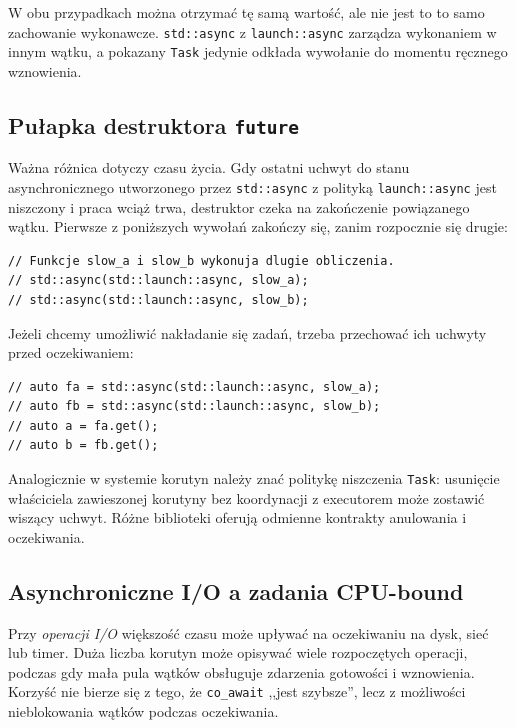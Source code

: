 W obu przypadkach można otrzymać tę samą wartość, ale nie jest to
to samo zachowanie wykonawcze. \texttt{std::async} z \texttt{launch::async}
zarządza wykonaniem w innym wątku, a pokazany \texttt{Task}
jedynie odkłada wywołanie do momentu ręcznego wznowienia.

\subsection{Pułapka destruktora \texttt{future}}

Ważna różnica dotyczy czasu życia. Gdy ostatni uchwyt do stanu
asynchronicznego utworzonego przez \texttt{std::async} z polityką
\texttt{launch::async} jest niszczony i praca wciąż trwa, destruktor
czeka na zakończenie powiązanego wątku.
Pierwsze z poniższych wywołań zakończy się, zanim rozpocznie się drugie:

\begin{lstlisting}[caption={Zignorowany future wymusza oczekiwanie; fragment.}]
// Funkcje slow_a i slow_b wykonuja dlugie obliczenia.
// std::async(std::launch::async, slow_a);
// std::async(std::launch::async, slow_b);
\end{lstlisting}

Jeżeli chcemy umożliwić nakładanie się zadań, trzeba przechować ich
uchwyty przed oczekiwaniem:
\begin{lstlisting}[caption={Dwa przyszłe wyniki powinny żyć jednocześnie; fragment.}]
// auto fa = std::async(std::launch::async, slow_a);
// auto fb = std::async(std::launch::async, slow_b);
// auto a = fa.get();
// auto b = fb.get();
\end{lstlisting}

Analogicznie w systemie korutyn należy znać politykę niszczenia
\texttt{Task}: usunięcie właściciela zawieszonej korutyny bez
koordynacji z executorem może zostawić wiszący uchwyt. Różne
biblioteki oferują odmienne kontrakty anulowania i oczekiwania.

\subsection{Asynchroniczne I/O a zadania CPU-bound}

Przy \emph{operacji I/O} większość czasu może upływać na oczekiwaniu
na dysk, sieć lub timer. Duża liczba korutyn może opisywać wiele
rozpoczętych operacji, podczas gdy mała pula wątków obsługuje
zdarzenia gotowości i wznowienia. Korzyść nie bierze się z tego,
że \texttt{co\_await} ,,jest szybsze'', lecz z możliwości
nieblokowania wątków podczas oczekiwania.

